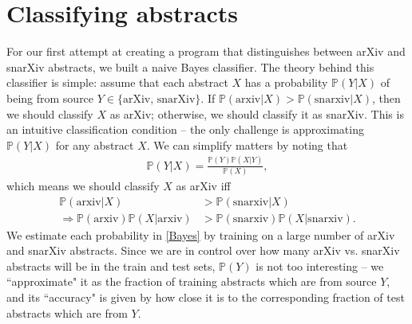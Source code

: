 \documentclass{article}
\renewcommand{\P}{\mathbb{P}} %
\begin{document}
\section{Classifying abstracts}
For our first attempt at creating a program that distinguishes between arXiv and snarXiv abstracts, we built a naive Bayes classifier.
The theory behind this classifier is simple:
assume that each abstract $X$ has a probability $\P(Y|X)$ of being from source $Y\in\{\text{arXiv, snarXiv}\}$.
If $\P(\text{arxiv}|X) > \P(\text{snarxiv}|X)$, then we should classify $X$ as arXiv; otherwise, we should classify it as snarXiv.
This is an intuitive classification condition -- the only challenge is approximating $\P(Y|X)$ for any abstract $X$.
We can simplify matters by noting that
\begin{align}
	\P(Y|X) = \frac{\P(Y)\P(X|Y)}{\P(X)},
\end{align}
which means we should classify $X$ as arXiv iff
\begin{align}
	\P(\text{arxiv}|X) &> \P(\text{snarxiv}|X)  \\
	\Rightarrow	\P(\text{arxiv})\P(X|\text{arxiv}) &> \P(\text{snarxiv})\P(X|\text{snarxiv}). \label{Bayes}
\end{align}
We estimate each probability in \eqref{Bayes} by training on a large number of arXiv and snarXiv abstracts.
Since we are in control over how many arXiv vs. snarXiv abstracts will be in the train and test sets, $\P(Y)$ is not too interesting -- we ``approximate" it as the fraction of training abstracts which are from source $Y$, and its ``accuracy" is given by how close it is to the corresponding fraction of test abstracts which are from $Y$.
\end{document}
